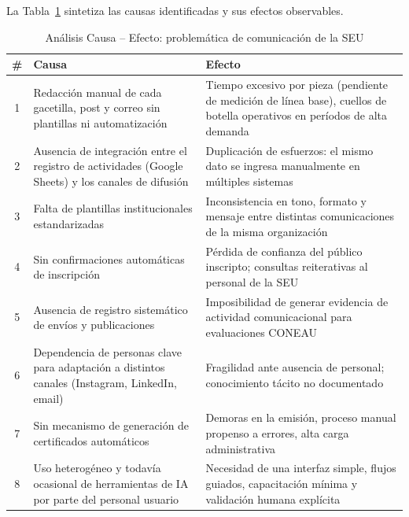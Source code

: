 \documentclass[a4paper, 12pt]{article}
\begin{document}
La Tabla~\ref{tab:causa-efecto} sintetiza las causas identificadas y sus efectos observables.

\begin{table}[H]
  \centering
  \caption{An\'alisis Causa -- Efecto: problem\'atica de comunicaci\'on de la SEU}
  \label{tab:causa-efecto}
  \begin{tabularx}{\textwidth}{c>{\raggedright\arraybackslash}X>{\raggedright\arraybackslash}X}
    \toprule
    \textbf{\#} & \textbf{Causa} & \textbf{Efecto} \\
    \midrule
    1 & Redacci\'on manual de cada gacetilla, post y correo sin plantillas ni automatizaci\'on & Tiempo excesivo por pieza (pendiente de medici\'on de l\'inea base), cuellos de botella operativos en per\'iodos de alta demanda \\
    2 & Ausencia de integraci\'on entre el registro de actividades (Google Sheets) y los canales de difusi\'on & Duplicaci\'on de esfuerzos: el mismo dato se ingresa manualmente en m\'ultiples sistemas \\
    3 & Falta de plantillas institucionales estandarizadas & Inconsistencia en tono, formato y mensaje entre distintas comunicaciones de la misma organizaci\'on \\
    4 & Sin confirmaciones autom\'aticas de inscripci\'on & P\'erdida de confianza del p\'ublico inscripto; consultas reiterativas al personal de la SEU \\
    5 & Ausencia de registro sistem\'atico de env\'ios y publicaciones & Imposibilidad de generar evidencia de actividad comunicacional para evaluaciones CONEAU \\
    6 & Dependencia de personas clave para adaptaci\'on a distintos canales (Instagram, LinkedIn, email) & Fragilidad ante ausencia de personal; conocimiento t\'acito no documentado \\
    7 & Sin mecanismo de generaci\'on de certificados autom\'aticos & Demoras en la emisi\'on, proceso manual propenso a errores, alta carga administrativa \\
    8 & Uso heterog\'eneo y todav\'ia ocasional de herramientas de IA por parte del personal usuario & Necesidad de una interfaz simple, flujos guiados, capacitaci\'on m\'inima y validaci\'on humana expl\'icita \\
    \bottomrule
  \end{tabularx}
\end{table}

\end{document}
